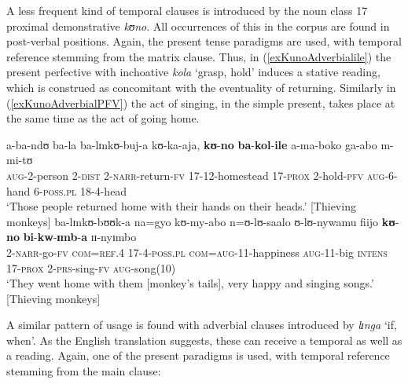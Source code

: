 A less frequent kind of temporal clauses is introduced by the  noun class 17 proximal demonstrative \textit{kʊno}. All occurrences of this in the corpus are found in post-verbal positions. Again, the present tense paradigms are used, with temporal reference stemming from the matrix clause. Thus, in (\ref{exKunoAdverbialile}) the present perfective with inchoative \textit{kola} \lq grasp, hold' induces a stative reading, which is construed as concomitant with the eventuality of returning. Similarly in (\ref{exKunoAdverbialPFV}) the act of singing, in the simple present, takes place at the same time as the act of going home.
\begin{exe}
\ex \label{exKunoAdverbialile} \gll a-ba-ndʊ ba-la ba-lɪnkʊ-buj-a kʊ-ka-aja, \textbf{kʊ}-\textbf{no} \textbf{ba}-\textbf{kol}-\textbf{ile} a-ma-boko ga-abo m-mi-tʊ\\
\textsc{aug}-2-person 2-\textsc{dist} 2-\textsc{narr}-return-\textsc{fv} 17-12-homestead 17-\textsc{prox} 2-hold-\textsc{pfv} \textsc{aug}-6-hand 6-\textsc{poss.pl} 18-4-head\\
\glt `‎‎Those people returned home with their hands on their heads.' [Thieving monkeys]
\ex \label{exKunoAdverbialPFV} \gll ba-lɪnkʊ-bʊʊk-a na=gyo kʊ-my-abo n=ʊ-lʊ-saalo ʊ-lʊ-nywamu fiijo \textbf{kʊ}-\textbf{no} \textbf{bi}-\textbf{kw}-\textbf{ɪmb}-\textbf{a} ɪɪ-nyɪmbo\\
2-\textsc{narr}-go-\textsc{fv} \textsc{com}=\textsc{ref.4} 17-4-\textsc{poss.pl} \textsc{com}=\textsc{aug}-11-happiness \textsc{aug}-11-big \textsc{intens} 17-\textsc{prox} 2-\textsc{prs}-sing-\textsc{fv} \textsc{aug}-song(10)\\
\glt `They went home with them [monkey's tails], very happy and singing songs.' [Thieving monkeys]
\end{exe}

A similar pattern of usage is found with adverbial clauses introduced by \textit{lɪnga} \lq if, when'. As the English translation suggests, these can receive a temporal as well as a  reading. Again, one of the present paradigms is used, with temporal reference stemming from the main clause:

